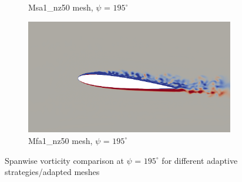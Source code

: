 \begin{figure}[H]
\begin{subfigure}[b]{0.475\textwidth}
\caption{Msa1\_nz50 mesh, $\psi$ = $195^\circ$}
\label{fig:hadapt_psi195}
\end{subfigure}
\begin{subfigure}[b]{0.475\textwidth}
\centering
\includegraphics[width=1\textwidth]{figures/adapt_strat/vorticity_plots/Mfa1_50/phase_195.png}
\caption{Mfa1\_nz50 mesh, $\psi$ = $195^\circ$}
\label{fig:FB_psi195}
\end{subfigure}
\caption{Spanwise vorticity comparison at $\psi$ = $195^\circ$ for different adaptive strategies/adapted meshes}
\label{fig:vorticity_195}
\end{figure}



